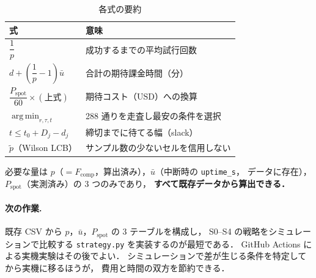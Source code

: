 \documentclass[11pt,a4paper]{ltjsarticle}
\newcommand{\Fcomp}{F_{\mathrm{comp}}}
\newcommand{\Pspot}{P_{\mathrm{spot}}}
\begin{document}
\begin{table}[htbp]
\centering
\caption{各式の要約}
\label{tab:summary}
\begin{tabularx}{\textwidth}{@{}lX@{}}
\toprule
式 & 意味 \\
\midrule
$\dfrac{1}{p}$
  & 成功するまでの平均試行回数 \\[6pt]
$d + \left(\dfrac{1}{p}-1\right)\bar u$
  & 合計の期待課金時間（分） \\[6pt]
$\dfrac{\Pspot}{60}\times(\text{上式})$
  & 期待コスト（USD）への換算 \\[6pt]
$\operatorname*{arg\,min}_{r,\tau,t}$
  & 288 通りを走査し最安の条件を選択 \\[6pt]
$t \le t_0 + D_j - d_j$
  & 締切までに待てる幅（slack） \\[6pt]
$\tilde p$（Wilson LCB）
  & サンプル数の少ないセルを信用しない \\
\bottomrule
\end{tabularx}
\end{table}

必要な量は $p$（$=\Fcomp$，算出済み），$\bar u$（中断時の \texttt{uptime\_s}，
データに存在），$\Pspot$（実測済み）の 3 つのみであり，
\textbf{すべて既存データから算出できる．}

\paragraph{次の作業.}
既存 CSV から $p$，$\bar u$，$\Pspot$ の 3 テーブルを構成し，
S0--S4 の戦略をシミュレーションで比較する \texttt{strategy.py} を実装するのが最短である．
GitHub Actions による実機実験はその後でよい．
シミュレーションで差が生じる条件を特定してから実機に移るほうが，
費用と時間の双方を節約できる．
\end{document}
